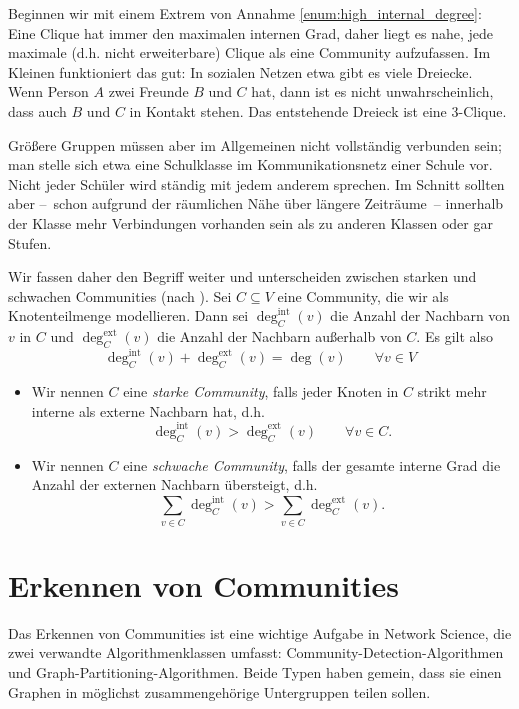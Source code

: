 Beginnen wir mit einem Extrem von Annahme \ref{enum:high_internal_degree}:
Eine Clique hat immer den maximalen internen Grad, daher liegt es nahe, jede maximale (d.h. nicht erweiterbare) Clique als eine Community aufzufassen.
Im Kleinen funktioniert das gut: In sozialen Netzen etwa gibt es viele Dreiecke.
Wenn Person $A$ zwei Freunde $B$ und $C$ hat, dann ist es nicht unwahrscheinlich, dass auch $B$ und $C$ in Kontakt stehen.
Das entstehende Dreieck ist eine 3-Clique.

Größere Gruppen müssen aber im Allgemeinen nicht vollständig verbunden sein;
man stelle sich etwa eine Schulklasse im Kommunikationsnetz einer Schule vor.
Nicht jeder Schüler wird ständig mit jedem anderem sprechen.
Im Schnitt sollten aber --~schon aufgrund der räumlichen Nähe über längere Zeiträume~-- innerhalb der Klasse mehr Verbindungen vorhanden sein als zu anderen Klassen oder gar Stufen.

\def\intdeg{\deg^{\text{int}}_C}
\def\extdeg{\deg^{\text{ext}}_C}

Wir fassen daher den Begriff weiter und unterscheiden zwischen starken und schwachen Communities (nach \cite{barabasi2014network}).
Sei $C \subseteq V$ eine Community, die wir als Knotenteilmenge modellieren.
Dann sei $\intdeg(v)$ die Anzahl der Nachbarn von $v$ in $C$ und $\extdeg(v)$ die Anzahl der Nachbarn außerhalb von $C$.
Es gilt also
\begin{equation}
    \intdeg(v) + \extdeg(v) = \deg(v) \qquad \forall v \in V
\end{equation}

\begin{itemize}
    \item Wir nennen $C$ eine \emph{starke Community}, falls jeder Knoten in $C$ strikt mehr interne als externe Nachbarn hat, d.h.
          \begin{equation}
              \intdeg(v) > \extdeg(v) \qquad \forall v \in C.
          \end{equation}

    \item Wir nennen $C$ eine \emph{schwache Community}, falls der gesamte interne Grad die Anzahl der externen Nachbarn übersteigt, d.h.
          \begin{equation}
              \sum_{v\in C}\intdeg(v) > \sum_{v\in C} \extdeg(v).
          \end{equation}
\end{itemize}

\section{Erkennen von Communities}
Das Erkennen von Communities ist eine wichtige Aufgabe in Network Science, die zwei verwandte Algorithmenklassen umfasst:
Community-Detection-Algorithmen und Graph-Partitioning-Algorithmen.
Beide Typen haben gemein, dass sie einen Graphen in möglichst zusammengehörige Untergruppen teilen sollen.

